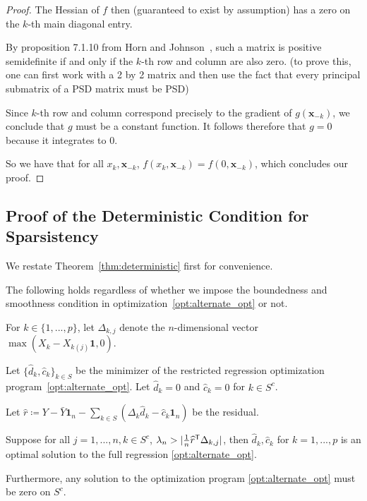 \begin{proof}
The Hessian of $f$ then (guaranteed to exist by assumption) has a zero on the $k$-th main diagonal entry. 

By proposition 7.1.10 from Horn and Johnson~\cite{HJ90},  such a matrix is positive semidefinite if and only if the $k$-th row and column are also zero. (to prove this, one can first work with a 2 by 2 matrix and then use the fact that every principal submatrix of a PSD matrix must be PSD) 

Since $k$-th row and column correspond precisely to the gradient of $g(\mathbf{x}_{-k})$, we conclude that $g$ must be a constant function. It follows therefore that $g = 0$ because it integrates to 0. 

So we have that for all $x_k, \mathbf{x}_{-k}$, $f(x_k, \mathbf{x}_{-k}) = f(0, \mathbf{x}_{-k})$, which concludes our proof.

\end{proof}
 
 
 
 
 

 
 
 
 \subsection{Proof of the Deterministic Condition for Sparsistency}
 \label{sec:deterministic_proof}
 
 We restate Theorem~\ref{thm:deterministic} first for convenience.
 
\begin{theorem} 
The following holds regardless of whether we impose the boundedness and smoothness condition in optimization~\ref{opt:alternate_opt} or not.

For $k \in \{1,...,p\}$, let $\Delta_{k, j}$ denote the $n$-dimensional vector $\max( X_k - X_{k (j)} \mathbf{1}, 0)$. 

Let $\{\hat{d}_k, \hat{c}_k \}_{k \in S}$ be the minimizer of the restricted regression optimization program~\ref{opt:alternate_opt}. 
Let $\hat{d}_k = 0$ and $ \hat{c}_k = 0$ for $k \in S^c$.

Let $\hat{r} \coloneqq Y - \bar{Y} \mathbf{1}_n - \sum_{k \in S} (\Delta_k \hat{d}_k - \hat{c}_k \mathbf{1}_n) $ be the residual.

Suppose for all $j=1,...,n, k\in S^c$, $\lambda_n > | \frac{1}{n} \widehat{r}^{\mathsf{T}} \Delta_{k,j}|$, then $\hat{d}_k, \hat{c}_k$ for $k=1,...,p$ is an optimal solution to the full regression \ref{opt:alternate_opt}.

Furthermore, any solution to the optimization program \ref{opt:alternate_opt} must be zero on $S^c$.
\end{theorem}

